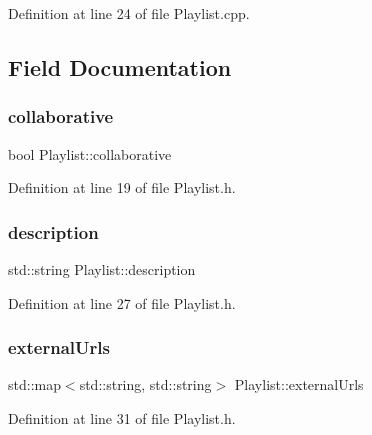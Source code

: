 Definition at line 24 of file Playlist.\+cpp.



\subsection{Field Documentation}
\mbox{\label{class_playlist_a292ead16298d6a878ac3bbc6a98ce37b}} 
\subsubsection{\texorpdfstring{collaborative}{collaborative}}
{\footnotesize\ttfamily bool Playlist\+::collaborative\hspace{0.3cm}{\ttfamily [private]}}



Definition at line 19 of file Playlist.\+h.

\mbox{\label{class_playlist_a5fd6ff7a7e61f85a97e26236c36eef3c}} 
\subsubsection{\texorpdfstring{description}{description}}
{\footnotesize\ttfamily std\+::string Playlist\+::description\hspace{0.3cm}{\ttfamily [private]}}



Definition at line 27 of file Playlist.\+h.

\mbox{\label{class_playlist_aeaa259fcf7805cc25feeebaa80495b23}} 
\subsubsection{\texorpdfstring{external\+Urls}{externalUrls}}
{\footnotesize\ttfamily std\+::map$<$std\+::string, std\+::string$>$ Playlist\+::external\+Urls\hspace{0.3cm}{\ttfamily [private]}}



Definition at line 31 of file Playlist.\+h.


